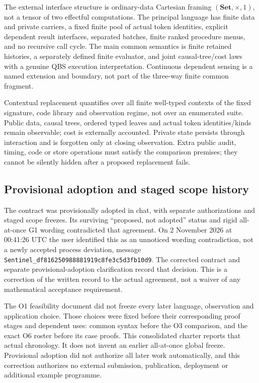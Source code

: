 \documentclass[11pt,a4paper]{article}
\theoremstyle{definition}
\newcommand{\Set}{\mathbf{Set}}
\begin{document}
The external interface structure is ordinary-data Cartesian framing
\((\Set,\times,1)\), not a tensor of two effectful computations. The
principal language has finite data and private carriers, a fixed finite
pool of actual token identities, explicit dependent result interfaces,
separated batches, finite ranked procedure menus, and no recursive call
cycle. The main common semantics is finite retained histories, a separately
defined finite evaluator, and joint causal-tree/cost laws with a genuine QBS
execution interpretation. Continuous dependent sensing is a named extension
and boundary, not part of the three-way finite common fragment.

Contextual replacement quantifies over all finite well-typed contexts of
the fixed signature, code library and observation regime, not over an
enumerated suite. Public data, causal trees, ordered typed leaves and
actual token identities/kinds remain observable; cost is externally
accounted. Private state persists through interaction and is forgotten
only at closing observation. Extra public audit, timing, code or store
operations must satisfy the comparison premises; they cannot be silently
hidden after a proposed replacement fails.

\subsection{Provisional adoption and staged scope history}
The contract was provisionally adopted in chat, with separate authorizations
and staged scope freezes. Its surviving ``proposed, not adopted'' status
and rigid all-at-once G1 wording contradicted that agreement. On
2 November 2026 at 00:41:26 UTC the user identified this as an unnoticed
wording contradiction, not a newly accepted process deviation, message
\texttt{Sentinel\_df816250988881919c8fe3c5d3fb10d9}.
The corrected contract and separate provisional-adoption clarification
record that decision. This is a correction of the written record to the
actual agreement, not a waiver of any mathematical acceptance requirement.

The O1 feasibility document did not freeze every later language,
observation and application choice. Those choices were fixed before their
corresponding proof stages and dependent uses: common syntax before the
O3 comparison, and the exact O6 roster before its case proofs. This
consolidated charter reports that actual chronology. It does not invent an
earlier all-at-once global freeze. Provisional adoption did not authorize
all later work automatically, and this correction authorizes no external
submission, publication, deployment or additional example programme.
\end{document}
